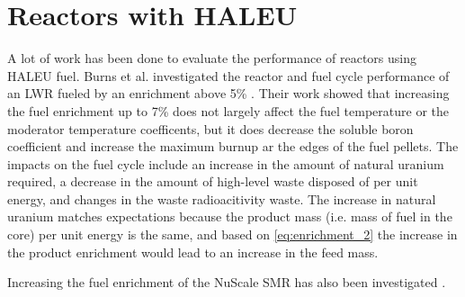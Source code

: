 \section{Reactors with HALEU}
A lot of work has been done to evaluate the performance of reactors 
using \gls{HALEU} fuel. Burns et al. investigated the reactor and fuel cycle 
performance of an \gls{LWR} fueled by an enrichment above 5\% \cite{burns_reactor_2020}.
Their work showed that increasing the fuel enrichment up to 7\% does not 
largely affect the fuel temperature or the moderator temperature coefficents,
but it does decrease the soluble boron coefficient and increase the maximum 
burnup ar the edges of the fuel pellets. The impacts on the fuel cycle include 
an increase in the amount of natural uranium required, a decrease in the 
amount of high-level waste disposed of per unit energy, and changes in the 
waste radioacitivity waste. The increase in natural uranium matches 
expectations
because the product mass (i.e. mass of fuel in the core) per unit 
energy is the same, and 
based on \ref{eq:enrichment_2} the increase in the product enrichment would 
lead to an increase in the feed mass. 

Increasing the fuel enrichment of the NuScale SMR has also been investigated 
\cite{carlson_implications_2022}.
